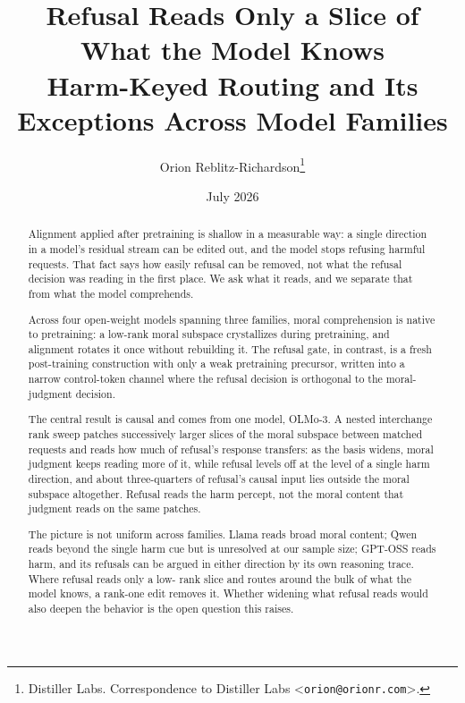 \documentclass{article}
\title{Refusal Reads Only a Slice of What the Model Knows\\[0.4em]
  {\large\mdseries Harm-Keyed Routing and Its Exceptions Across Model Families}}
\author{%
  Orion Reblitz-Richardson\thanks{%
    Distiller Labs. Correspondence to Distiller Labs
    \textless\texttt{orion@orionr.com}\textgreater.}
}
\date{July 2026}
\begin{document}
\maketitle

\begin{abstract}
Alignment applied after pretraining is shallow in a measurable way: a single direction in a
model's residual stream can be edited out, and the model stops refusing harmful requests. That
fact says how easily refusal can be removed, not what the refusal decision was reading in the
first place. We ask what it reads, and we separate that from what the model comprehends.

Across four open-weight models spanning three families, moral comprehension is native to
pretraining: a low-rank moral subspace crystallizes during pretraining, and alignment rotates it
once without rebuilding it. The refusal gate, in contrast, is a fresh post-training construction
with only a weak pretraining precursor, written into a narrow control-token channel where the
refusal decision is orthogonal to the moral-judgment decision.

The central result is causal and comes from one model, OLMo-3. A nested interchange rank sweep
patches successively larger slices of the moral subspace between matched requests and reads how
much of refusal's response transfers: as the basis widens, moral judgment keeps reading more of
it, while refusal levels off at the level of a single harm direction, and about three-quarters
of refusal's causal input lies outside the moral subspace altogether. Refusal reads the harm
percept, not the moral content that judgment reads on the same patches.

The picture is not uniform across families. Llama reads broad moral content; Qwen reads beyond
the single harm cue but is unresolved at our sample size; GPT-OSS reads harm, and its refusals
can be argued in either direction by its own reasoning trace. Where refusal reads only a low-
rank slice and routes around the bulk of what the model knows, a rank-one edit removes it.
Whether widening what refusal reads would also deepen the behavior is the open question this
raises.
\end{abstract}












\end{document}
